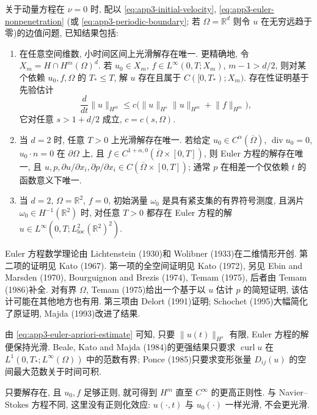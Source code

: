 关于动量方程在 $\nu=0$ 时, 配以 
\eqref{eq:app3-initial-velocity}, 
\eqref{eq:app3-euler-nonpenetration} (或 
\eqref{eq:app3-periodic-boundary}; 若 $\Omega=\mathbb R^d$ 则令 $u$ 在无穷远趋于零)的边值问题, 已知结果包括:

\hypertarget{appendix-03-page-371}{}
\begin{enumerate}
\item 在任意空间维数, 小时间区间上光滑解存在唯一. 更精确地, 令 $X_m=H\cap H^m(\Omega)^d$. 若 $u_0\in X_m$, $f\in L^\infty(0,T;X_m)$, $m-1>d/2$, 则对某个依赖 $u_0,f,\Omega$ 的 $T_*\leq T$, 解 $u$ 存在且属于 $C([0,T_*);X_m)$. 存在性证明基于先验估计
\begin{equation}
\frac d{dt}\lVert u\rVert_{H^m}
\leq c\bigl(\lVert u\rVert_{H^s}\lVert u\rVert_{H^m}+\lVert f\rVert_{H^m}\bigr),
\label{eq:app3-euler-apriori-estimate}
\end{equation}
它对任意 $s>1+d/2$ 成立, $c=c(s,\Omega)$.
\item 当 $d=2$ 时, 任意 $T>0$ 上光滑解存在唯一. 若给定 $u_0\in C^\alpha(\overline\Omega)$, $\operatorname{div}u_0=0$, $u_0\cdot n=0$ 在 $\partial\Omega$ 上, 且 $f\in C^{1+\alpha,0}(\overline\Omega\times[0,T])$, 则 Euler 方程的解存在唯一, 且 $u,p,\partial u/\partial x_i,\partial p/\partial x_i\in C(\overline\Omega\times[0,T])$; 通常 $p$ 在相差一个仅依赖 $t$ 的函数意义下唯一.
\item 当 $d=2$, $\Omega=\mathbb R^2$, $f=0$, 初始涡量 $\omega_0$ 是具有紧支集的有界符号测度, 且涡片 $\omega_0\in H^{-1}(\mathbb R^2)$ 时, 对任意 $T>0$ 都存在 Euler 方程的解 $u\in L^\infty(0,T;L_{\mathrm{loc}}^2(\mathbb R^2)^2)$.
\end{enumerate}

Euler 方程数学理论由 Lichtenstein (1930)和 Wolibner (1933)在二维情形开创. 第二项的证明见 Kato (1967). 第一项的全空间证明见 Kato (1972), 另见 Ebin and Marsden (1970), Bourguignon and Brezis (1974), Temam (1975), 后者由 Temam (1986)补全. 对有界 $\Omega$, Temam (1975)给出一个基于以 $u$ 估计 $p$ 的简短证明, 该估计可能在其他地方也有用. 第三项由 Delort (1991)证明; Schochet (1995)大幅简化了原证明, Majda (1993)改进了结果.

由 
\eqref{eq:app3-euler-apriori-estimate} 可知, 只要 $\lVert u(t)\rVert_{H^s}$ 有限, Euler 方程的解便保持光滑. Beale, Kato and Majda (1984)的更强结果只要求 $\operatorname{curl}u$ 在 $L^1(0,T_*;L^\infty(\Omega))$ 中的范数有界; Ponce (1985)只要求变形张量 $D_{ij}(u)$ 的空间最大范数关于时间可积.

只要解存在, 且 $u_0,f$ 足够正则, 就可得到 $H^m$ 直至 $C^\infty$ 的更高正则性. 与 Navier--Stokes 方程不同, 这里没有正则化效应: $u(\cdot,t)$ 与 $u_0(\cdot)$ 一样光滑, 不会更光滑.

